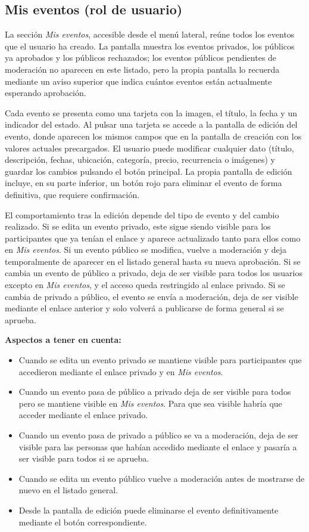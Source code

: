 \clearpage

\subsection{Mis eventos (rol de usuario)}

La sección \textit{Mis eventos}, accesible desde el menú lateral, reúne todos los eventos que el usuario ha creado. La pantalla muestra los eventos privados, los públicos ya aprobados y los públicos rechazados; los eventos públicos pendientes de moderación no aparecen en este listado, pero la propia pantalla lo recuerda mediante un aviso superior que indica cuántos eventos están actualmente esperando aprobación.

Cada evento se presenta como una tarjeta con la imagen, el título, la fecha y un indicador del estado. Al pulsar una tarjeta se accede a la pantalla de edición del evento, donde aparecen los mismos campos que en la pantalla de creación con los valores actuales precargados. El usuario puede modificar cualquier dato (título, descripción, fechas, ubicación, categoría, precio, recurrencia o imágenes) y guardar los cambios pulsando el botón principal. La propia pantalla de edición incluye, en su parte inferior, un botón rojo para eliminar el evento de forma definitiva, que requiere confirmación.

El comportamiento tras la edición depende del tipo de evento y del cambio realizado. Si se edita un evento privado, este sigue siendo visible para los participantes que ya tenían el enlace y aparece actualizado tanto para ellos como en \textit{Mis eventos}. Si un evento público se modifica, vuelve a moderación y deja temporalmente de aparecer en el listado general hasta su nueva aprobación. Si se cambia un evento de público a privado, deja de ser visible para todos los usuarios excepto en \textit{Mis eventos}, y el acceso queda restringido al enlace privado. Si se cambia de privado a público, el evento se envía a moderación, deja de ser visible mediante el enlace anterior y solo volverá a publicarse de forma general si se aprueba.
\bigskip

\textbf{Aspectos a tener en cuenta:}
\begin{itemize}[leftmargin=1.5em]

\item Cuando se edita un evento privado se mantiene visible para participantes que accedieron mediante el enlace privado y en \textit{Mis eventos}.
\item Cuando un evento pasa de público a privado deja de ser visible para todos pero se mantiene visible en \textit{Mis eventos}. Para que sea visible habría que acceder mediante el enlace privado.
\item Cuando un evento pasa de privado a público se va a moderación, deja de ser visible para las personas que habían accedido mediante el enlace y pasaría a ser visible para todos si se aprueba.
\item Cuando se edita un evento público vuelve a moderación antes de mostrarse de nuevo en el listado general.
\item Desde la pantalla de edición puede eliminarse el evento definitivamente mediante el botón correspondiente.
\end{itemize}

